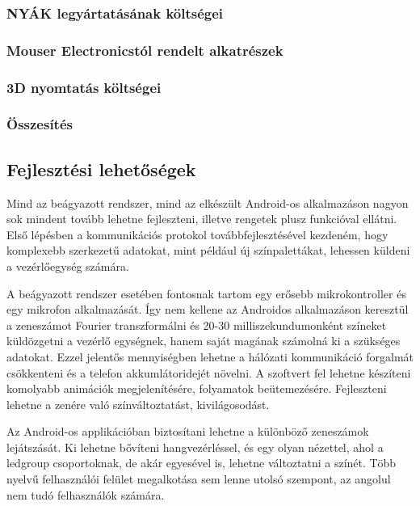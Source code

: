 \documentclass[../main.tex]{subfiles}
\begin{document}
        \subsubsection{NYÁK legyártatásának költségei}
        \subsubsection{Mouser Electronicstól rendelt alkatrészek}
        \subsubsection{3D nyomtatás költségei}
        
        \subsubsection{Összesítés}
            
        
    
    \subsection{Fejlesztési lehetőségek}
        Mind az beágyazott rendszer, mind az elkészült Android-os alkalmazáson nagyon sok mindent tovább lehetne fejleszteni, illetve rengetek plusz funkcióval ellátni. Első lépésben a kommunikációs protokol továbbfejlesztésével kezdeném, hogy komplexebb szerkezetű adatokat, mint például új színpalettákat, lehessen küldeni a vezérlőegység számára.
        
        A beágyazott rendszer esetében fontosnak tartom egy erősebb mikrokontroller és egy mikrofon alkalmazását. Így nem kellene az Androidos alkalmazáson keresztül a zeneszámot Fourier transzformálni és 20-30 milliszekundumonként színeket küldözgetni a vezérlő egységnek, hanem saját magának számolná ki a szükséges adatokat. Ezzel jelentős mennyiségben lehetne a hálózati kommunikáció forgalmát csökkenteni és a telefon akkumlátoridejét növelni. A szoftvert fel lehetne készíteni komolyabb animációk megjelenítésére, folyamatok beütemezésére. Fejleszteni lehetne a zenére való színváltoztatást, kivilágosodást.
        
        Az Android-os applikációban biztosítani lehetne a különböző zeneszámok lejátszását. Ki lehetne bővíteni hangvezérléssel, és egy olyan nézettel, ahol a ledgroup csoportoknak, de akár egyesével is, lehetne változtatni a színét. Több nyelvű felhasználói felület megalkotása sem lenne utolsó szempont, az angolul nem tudó felhasználók számára. 
        
        
\end{document}
